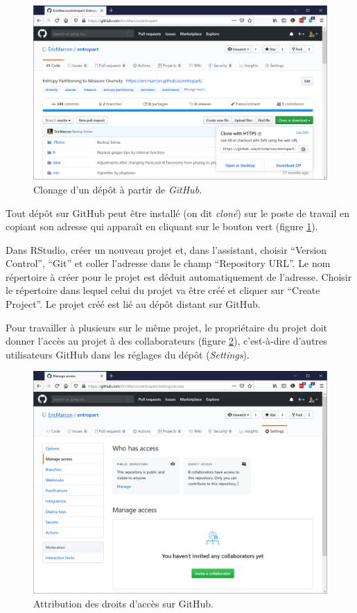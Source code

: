 \documentclass[
  12pt,
  french,
  a4paper,
  extrafontsizes,onecolumn,openright
  ]{memoir}
\begin{document}
\scriptsize

\begin{figure}

{\centering \includegraphics[width=0.8\linewidth]{images/git-Clone} 

}

\caption{Clonage d'un dépôt à partir de \emph{GitHub.}}\label{fig:git-Clone}
\end{figure}

\normalsize

Tout dépôt sur GitHub peut être installé (on dit \emph{cloné}) sur le poste de travail en copiant son adresse qui apparaît en cliquant sur le bouton vert (figure \ref{fig:git-Clone}).

Dans RStudio, créer un nouveau projet et, dans l'assistant, choisir \enquote{Version Control}, \enquote{Git} et coller l'adresse dans le champ \enquote{Repository URL}.
Le nom répertoire à créer pour le projet est déduit automatiquement de l'adresse.
Choisir le répertoire dans lequel celui du projet va être créé et cliquer sur \enquote{Create Project}.
Le projet créé est lié au dépôt distant sur GitHub.

Pour travailler à plusieurs sur le même projet, le propriétaire du projet doit donner l'accès au projet à des collaborateurs (figure \ref{fig:git-Access}), c'est-à-dire d'autres utilisateurs GitHub dans les réglages du dépôt (\emph{Settings}).



\scriptsize

\begin{figure}

{\centering \includegraphics[width=0.8\linewidth]{images/git-Access} 

}

\caption{Attribution des droits d'accès sur GitHub.}\label{fig:git-Access}
\end{figure}
\end{document}
